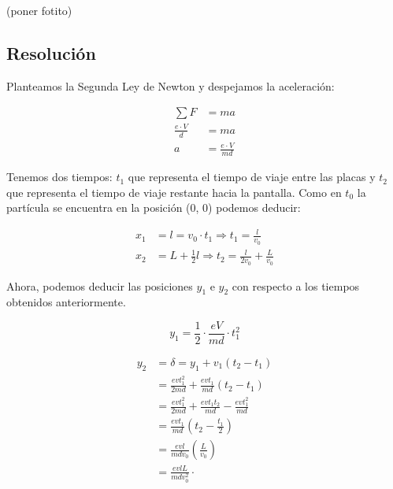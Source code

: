 \documentclass[11pt]{article}
\begin{document}
(poner fotito)


\subsection*{Resolución}

Planteamos la Segunda Ley de Newton y despejamos la aceleración:

\begin{align*}
  \sum F &= m a \\
  \frac{e \cdot V}{d} &= m a \\
  a &= \frac{e \cdot V}{md}
\end{align*}

Tenemos dos tiempos: $t_1$ que representa el tiempo de viaje entre las placas y
$t_2$ que representa el tiempo de viaje restante hacia la pantalla. Como en
$t_0$ la partícula se encuentra en la posición (0, 0) podemos deducir:

\begin{align*}
  x_1 &= l = v_0 \cdot t_1 \Rightarrow t_1 = \frac{l}{v_0} \\
  x_2 &= L + \frac{1}{2}l \Rightarrow t_2 = \frac{l}{2v_0} + \frac{L}{v_0}
\end{align*}

Ahora, podemos deducir las posiciones $y_1$ e $y_2$ con respecto a los tiempos
obtenidos anteriormente.

\begin{equation*}
  y_1 = \frac{1}{2} \cdot \frac{eV}{md} \cdot t_1^2
\end{equation*}

\begin{align*}
  y_2 &= \delta = y_1 + v_1 (t_2 - t_1)  \\
      &= \frac{e v t_1^2}{2 m d} + \frac{e v t_1}{m d} (t_2 - t_1) \\
      &= \frac{e v t_1^2}{2 m d} + \frac{e v t_1 t_2}{m d} - \frac{e v t_1^2}{m d} \\
      &= \frac{e v t_1}{m d} (t_2 - \frac{t_1}{2}) \\
      &= \frac{e v l}{m d v_0} (\frac{L}{v_0}) \\
      &= \frac{e v l L}{m d v_0^2} \cdot
\end{align*}
\end{document}
